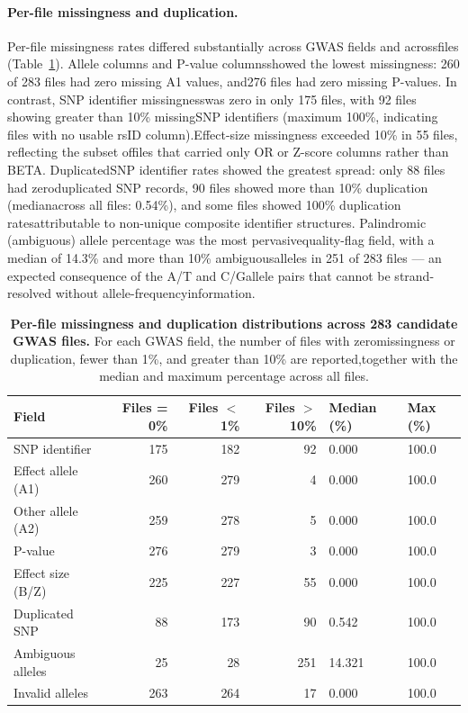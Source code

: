 \documentclass[11pt,a4paper]{article}
\begin{document}
\paragraph{Per-file missingness and duplication.}Per-file missingness rates differed substantially across GWAS fields and acrossfiles (Table~\ref{tab}). Allele columns and P-value columnsshowed the lowest missingness: 260 of 283 files had zero missing A1 values, and276 files had zero missing P-values. In contrast, SNP identifier missingnesswas zero in only 175 files, with 92 files showing greater than 10\% missingSNP identifiers (maximum 100\%, indicating files with no usable rsID column).Effect-size missingness exceeded 10\% in 55 files, reflecting the subset offiles that carried only OR or Z-score columns rather than BETA. DuplicatedSNP identifier rates showed the greatest spread: only 88 files had zeroduplicated SNP records, 90 files showed more than 10\% duplication (medianacross all files: 0.54\%), and some files showed 100\% duplication ratesattributable to non-unique composite identifier structures. Palindromic (ambiguous) allele percentage was the most pervasivequality-flag field, with a median of 14.3\% and more than 10\% ambiguousalleles in 251 of 283 files --- an expected consequence of the A/T and C/Gallele pairs that cannot be strand-resolved without allele-frequencyinformation.

\begin{table}[H]
\centering
\caption{\textbf{Per-file missingness and duplication distributions across 283 candidate GWAS files.} For each GWAS field, the number of files with zeromissingness or duplication, fewer than 1\%, and greater than 10\% are reported,together with the median and maximum percentage across all files.}
\label{tab}
\small
\begin{tabular}{lrrrll}
\toprule
\textbf{Field} & \textbf{Files = 0\%} & \textbf{Files $<$ 1\%} &\textbf{Files $>$ 10\%} & \textbf{Median (\%)} & \textbf{Max (\%)} \\
\midrule
SNP identifier      & 175 & 182 &  92 & 0.000 & 100.0 \\
Effect allele (A1)  & 260 & 279 &   4 & 0.000 & 100.0 \\
Other allele (A2)   & 259 & 278 &   5 & 0.000 & 100.0 \\
P-value             & 276 & 279 &   3 & 0.000 & 100.0 \\
Effect size (B/Z)   & 225 & 227 &  55 & 0.000 & 100.0 \\
Duplicated SNP      &  88 & 173 &  90 & 0.542 & 100.0 \\
Ambiguous alleles   &  25 &  28 & 251 & 14.321 & 100.0 \\
Invalid alleles     & 263 & 264 &  17 & 0.000 & 100.0 \\
\bottomrule
\end{tabular}
\end{table}
\end{document}

